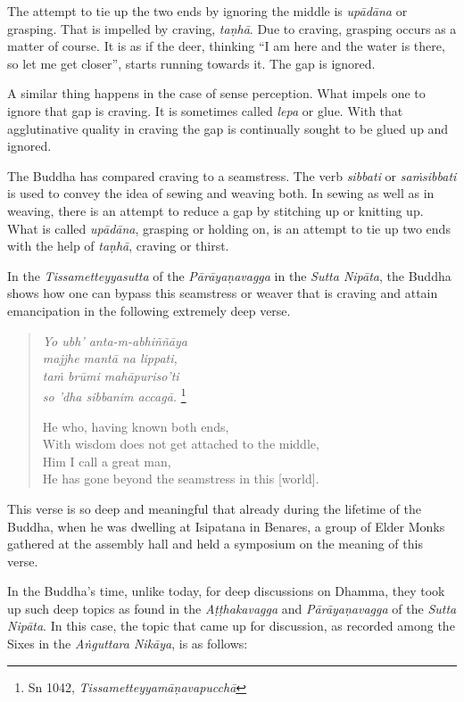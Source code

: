 The attempt to tie up the two ends by ignoring the middle is \emph{upādāna} or grasping. That is impelled by craving, \emph{taṇhā}. Due to craving, grasping occurs as a matter of course. It is as if the deer, thinking ``I am here and the water is there, so let me get closer'', starts running towards it. The gap is ignored.

A similar thing happens in the case of sense perception. What impels one to ignore that gap is craving. It is sometimes called \emph{lepa} or glue. With that agglutinative quality in craving the gap is continually sought to be glued up and ignored.

The Buddha has compared craving to a seamstress. The verb \emph{sibbati} or \emph{saṁsibbati} is used to convey the idea of sewing and weaving both. In sewing as well as in weaving, there is an attempt to reduce a gap by stitching up or knitting up. What is called \emph{upādāna}, grasping or holding on, is an attempt to tie up two ends with the help of \emph{taṇhā}, craving or thirst.

In the \emph{Tissametteyyasutta} of the \emph{Pārāyaṇavagga} in the \emph{Sutta Nipāta}, the Buddha shows how one can bypass this seamstress or weaver that is craving and attain emancipation in the following extremely deep verse.

\begin{quote}
\emph{Yo ubh' anta-m-abhiññāya}\\
\emph{majjhe mantā na lippati,}\\
\emph{taṁ brūmi mahāpuriso'ti}\\
\emph{so 'dha sibbanim accagā.} \footnote{Sn 1042, \emph{Tissametteyyamāṇavapucchā}}

He who, having known both ends,\\
With wisdom does not get attached to the middle,\\
Him I call a great man,\\
He has gone beyond the seamstress in this {[}world{]}.
\end{quote}

This verse is so deep and meaningful that already during the lifetime of the Buddha, when he was dwelling at Isipatana in Benares, a group of Elder Monks gathered at the assembly hall and held a symposium on the meaning of this verse.

In the Buddha's time, unlike today, for deep discussions on Dhamma, they took up such deep topics as found in the \emph{Aṭṭhakavagga} and \emph{Pārāyaṇavagga} of the \emph{Sutta Nipāta}. In this case, the topic that came up for discussion, as recorded among the Sixes in the \emph{Aṅguttara Nikāya}, is as follows:

